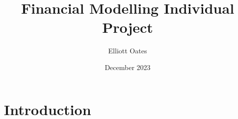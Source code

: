 \documentclass{article}
\title{Financial Modelling Individual Project}
\author{Elliott Oates}
\date{December 2023}
\begin{document}
\maketitle

\section{Introduction}
\end{document}
